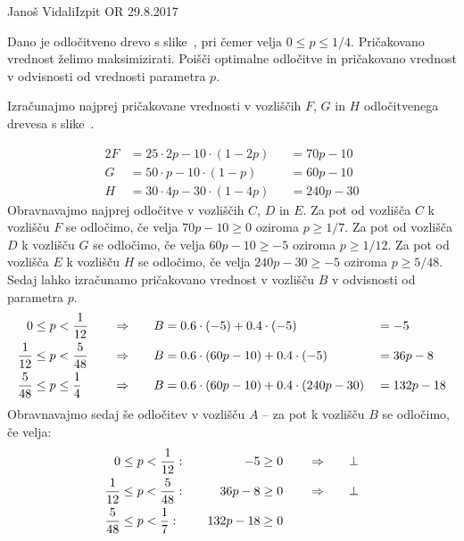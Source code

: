 \begin{naloga}{Janoš Vidali}{Izpit OR 29.8.2017}
\begin{vprasanje}
Dano je odločitveno drevo s slike~\fig,
pri čemer velja $0 \le p \le 1/4$.
Pričakovano vred\-nost želimo maksimizirati.
Poišči optimalne odločitve in pričakovano vrednost
v odvisnosti od vrednosti parametra $p$.

\begin{slika}
\pgfslika
{}
\end{slika}
\end{vprasanje}

\begin{odgovor}
Izračunajmo najprej pričakovane vrednosti
v vozliščih $F$, $G$ in $H$ odločitvenega drevesa s slike~\fig.

\begin{alignat*}{2}
F &= 25 \cdot 2p - 10 \cdot (1-2p) &&= 70p - 10 \\
G &= 50 \cdot p - 10 \cdot (1-p) &&= 60p - 10 \\
H &= 30 \cdot 4p - 30 \cdot (1-4p) &&= 240p - 30
\end{alignat*}
Obravnavajmo najprej odločitve v vozliščih $C$, $D$ in $E$.
Za pot od vozlišča $C$ k vozlišču $F$ se odločimo,
če velja $70p - 10 \ge 0$ oziroma $p \ge 1/7$.
Za pot od vozlišča $D$ k vozlišču $G$ se odločimo,
če velja $60p - 10 \ge -5$ oziroma $p \ge 1/12$.
Za pot od vozlišča $E$ k vozlišču $H$ se odločimo,
če velja $240p - 30 \ge -5$ oziroma $p \ge 5/48$.
Sedaj lahko izračunamo pričakovano vrednost v vozlišču $B$
v odvisnosti od parametra $p$.
\begin{alignat*}{4}
0 &\le p < {1 \over 12} &\quad&\Rightarrow\quad
& B &= 0.6 \cdot (-5) + 0.4 \cdot (-5) &&= -5 \\
{1 \over 12} &\le p < {5 \over 48} &\quad&\Rightarrow\quad
& B &= 0.6 \cdot (60p - 10) + 0.4 \cdot (-5) &&= 36p - 8 \\
{5 \over 48} &\le p \le {1 \over 4} &\quad&\Rightarrow\quad
& B &= 0.6 \cdot (60p - 10) + 0.4 \cdot (240p - 30) &&= 132p - 18
\end{alignat*}
Obravnavajmo sedaj še odločitev v vozlišču $A$
-- za pot k vozlišču $B$ se odločimo, če velja:
\begin{alignat*}{4}
0 &\le p < {1 \over 12}: &\quad -5 &\ge 0 &\quad&\Rightarrow\quad &&\bot \\
{1 \over 12} &\le p < {5 \over 48}: &\quad 36p - 8 &\ge 0
&\quad&\Rightarrow\quad &&\bot \\
{5 \over 48} &\le p < {1 \over 7}: &\quad 132p - 18 &\ge 0

\end{alignat*}
\end{odgovor}
\end{naloga}
